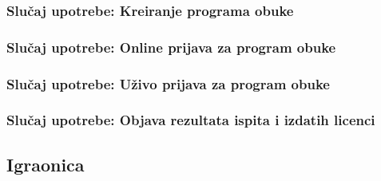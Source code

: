 \documentclass[a4paper]{article}
\begin{document}
\subsubsection{Slučaj upotrebe: Kreiranje programa obuke}


\subsubsection{Slučaj upotrebe: Online prijava za program obuke}


\subsubsection{Slučaj upotrebe: Uživo prijava za program obuke}


\subsubsection{Slučaj upotrebe: Objava rezultata ispita i izdatih licenci}



\subsection{Igraonica}
\end{document}
